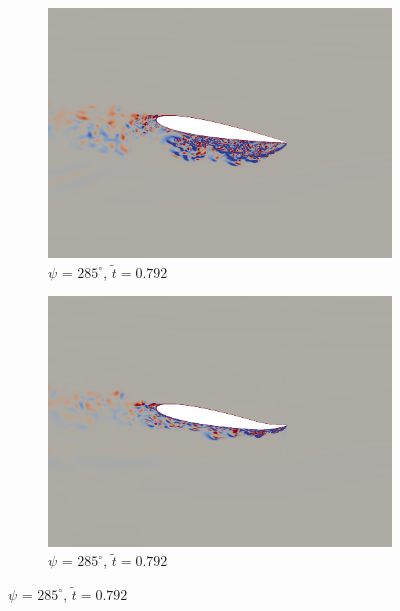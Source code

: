 \begin{figure}[H]
	\begin{subfigure}[b]{0.4\textwidth}
		\centering
		\includegraphics[width=1\textwidth]{figures/mu_2pt0/vorticity/baseline/phase_285.png}
		\caption{ $\psi$ = $285^\circ$, $\tilde{t}=0.792$}
		\label{fig:mu_2pt0_baseline_psi285}
	\end{subfigure}
	\begin{subfigure}[b]{0.4\textwidth}
		\centering
		\includegraphics[width=1\textwidth]{figures/mu_2pt0/vorticity/AC/phase_285.png}
		\caption{ $\psi$ = $285^\circ$,  $\tilde{t}=0.792$}
		\label{fig:mu_2pt0_AC_psi285}
	\end{subfigure}
	
	
	

\end{figure}
